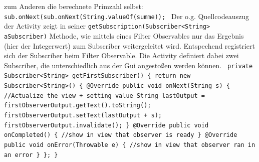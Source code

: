 \documentclass[12pt,oneside,a4paper,bibtotoc,liststotoc]{scrreprt}
\begin{document}
zum Anderen die berechnete Primzahl selbst:\newline
\texttt{\newline
sub.onNext(sub.onNext(String.valueOf(summe));\newline
}\newline
Der o.g. Quellcodeauszug der Activity zeigt in seiner \texttt{getSubscription(Subscriber<String> aSubscriber)}  Methode, wie mittels eines Filter Observables nur das Ergebnis (hier der Integerwert) zum Subscriber weitergeleitet wird. Entspechend registriert sich der Subscriber beim Filter Observable. Die Activity definiert dabei zwei Subscriber, die unterschiedlich aus der Gui angestoßen werden können.\newline
\texttt{\newline
private Subscriber<String> getFirstSubscriber() \{\newline
\newline
       return new Subscriber<String>() \{\newline
           @Override\newline
           public void onNext(String s) \{\newline
               //Actualize the view + setting value\newline
               String lastOutput = firstObserverOutput.getText().toString();\newline
               firstObserverOutput.setText(lastOutput + s);\newline
\newline
               firstObserverOutput.invalidate();\newline
           \}\newline
\newline
           @Override\newline
           public void onCompleted() \{\newline
               //show in view that observer is ready\newline
           \}\newline
\newline
           @Override\newline
           public void onError(Throwable e) \{\newline
               //show in view that observer ran in an error\newline
           \}\newline
       \};\newline
   \}\newline
}
\end{document}
